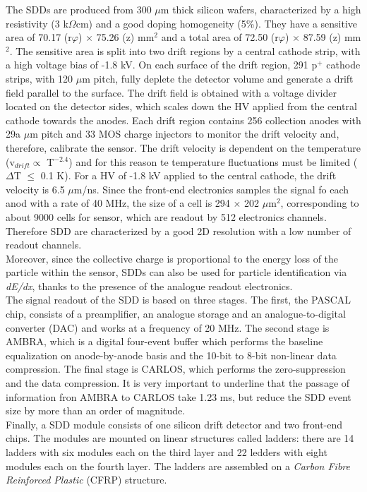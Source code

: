 The SDDs are produced from 300 $\mu$m thick silicon wafers, characterized by a high resistivity (3 k$\Omega$cm) and a good doping homogeneity (5\%). They have a sensitive area of 70.17 (r$\varphi$) $\times$ 75.26 (z) mm$^2$ and a total area of 72.50 (r$\varphi$) $\times$ 87.59 (z) mm$^2$. The sensitive area is split into two drift regions by a central cathode strip, with a high voltage bias of -1.8 kV. On each surface of the drift region, 291 p$^+$ cathode strips, with 120 $\mu$m pitch, fully deplete the detector volume and generate a drift field parallel to the surface. The drift field is obtained with a voltage divider located on the detector sides, which scales down the HV applied from the central cathode towards the anodes. Each drift region contains 256 collection anodes with 29a $\mu$m pitch and 33 MOS charge injectors to monitor the drift velocity and, therefore, calibrate the sensor. The drift velocity is dependent on the temperature (v$_{drift} \propto$ T$^{-2.4}$) and for this reason te temperature fluctuations must be limited ($\Delta$T $\leq$ 0.1 K). For a HV of -1.8 kV applied to the central cathode, the drift velocity is 6.5 $\mu$m/ns. Since the front-end electronics samples the signal fo each anod with a rate of 40 MHz, the size of a cell is 294 $\times$ 202 $\mu$m$^2$, corresponding to about 9000 cells for sensor, which are readout by 512 electronics channels. Therefore SDD are characterized by a good 2D resolution with a low number of readout channels.\\
Moreover, since the collective charge is proportional to the energy loss of the particle within the sensor, SDDs can also be used for particle identification via \textit{dE/dx}, thanks to the presence of the analogue readout electronics.\\
The signal readout of the SDD is based on three stages. The first, the PASCAL chip, consists of a preamplifier, an analogue storage and an analogue-to-digital converter (DAC) and works at a frequency of 20 MHz. The second stage is AMBRA, which is a digital four-event buffer which performs the baseline equalization on anode-by-anode basis and the 10-bit to 8-bit non-linear data compression. The final stage is CARLOS, which performs the zero-suppression and the data compression. It is very important to underline that the passage of information fron AMBRA to CARLOS take 1.23 ms, but reduce the SDD event size by more than an order of magnitude.\\
Finally, a SDD module consists of one silicon drift detector and two front-end chips. The modules are mounted on linear structures called ladders: there are 14 ladders with six modules each on the third layer and 22 ledders with eight modules each on the fourth layer. The ladders are assembled on a \textit{Carbon Fibre Reinforced Plastic} (CFRP) structure. 
